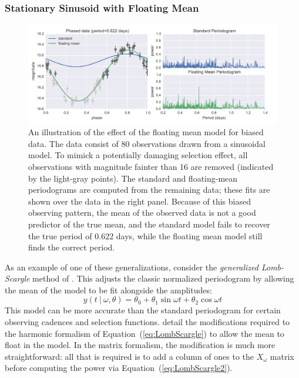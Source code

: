 \documentclass[12pt,preprint]{aastex}
\newcommand{\figlabel}[1]{\label{fig:#1}}
\newcommand{\Eq}[1]{Equation~(\ref{eq:#1})}
\newcommand{\eq}[1]{\Eq{#1}}
\newcommand{\sectlabel}[1]{\label{sect:#1}}
\begin{document}
\subsubsection{Stationary Sinusoid with Floating Mean}
\sectlabel{floating_mean}

\begin{figure}
  \centering
  \includegraphics[width=\textwidth]{fig02.pdf}
  \caption{
    An illustration of the effect of the floating mean model for biased data.
    The data consist of 80 observations drawn from a sinusoidal model. To mimick a potentially damaging selection effect, all observations with magnitude fainter than 16 are removed (indicated by the light-gray points). The standard and floating-mean periodograms are computed from the remaining data; these fits are shown over the data in the right panel. Because of this biased observing pattern, the mean of the observed data is not a good predictor of the true mean, and the standard model fails to recover the true period of 0.622 days, while the floating mean model still finds the correct period.
  }
  \figlabel{floating_mean}
\end{figure}

As an example of one of these generalizations, consider the {\it generalized Lomb-Scargle} method of \citet{Zechmeister09}. This adjusts the classic normalized periodogram by allowing the mean of the model to be fit alongside the amplitudes:
\begin{equation}
  y(t~|~\omega, \theta) = \theta_0 + \theta_1\sin\omega t + \theta_2\cos\omega t
\end{equation}
This model can be more accurate than the standard periodogram for certain observing cadences and selection functions. \citet{Zechmeister09} detail the modifications required to the harmonic formalism of \eq{LombScargle} to allow the mean to float in the model. In the matrix formalism, the modification is much more straightforward: all that is required is to add a column of ones to the $X_\omega$ matrix before computing the power via \eq{LombScargle2}.
\end{document}
